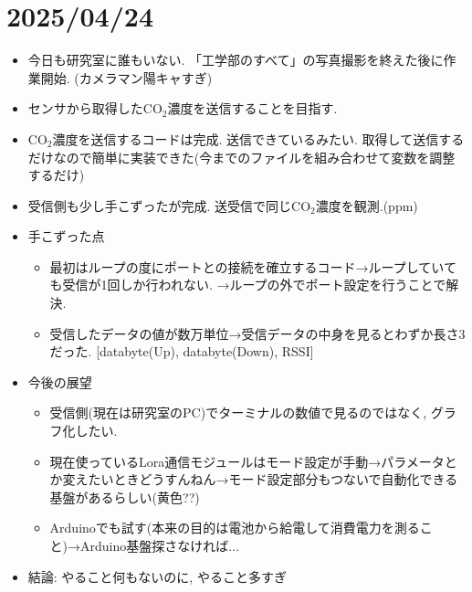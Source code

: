 \documentclass[11pt,a4paper,uplatex]{jsarticle}
\begin{document}
\section{2025/04/24}
\begin{itemize}
    \item 今日も研究室に誰もいない. 「工学部のすべて」の写真撮影を終えた後に作業開始. (カメラマン陽キャすぎ)
    \item センサから取得したCO$_2$濃度を送信することを目指す.
    \item CO$_2$濃度を送信するコードは完成. 送信できているみたい. 取得して送信するだけなので簡単に実装できた(今までのファイルを組み合わせて変数を調整するだけ)
    \item 受信側も少し手こずったが完成. 送受信で同じCO$_2$濃度を観測.(ppm)
    \item 手こずった点
    \begin{itemize}
        \item 最初はループの度にポートとの接続を確立するコード→ループしていても受信が1回しか行われない. →ループの外でポート設定を行うことで解決.
        \item 受信したデータの値が数万単位→受信データの中身を見るとわずか長さ3だった. [databyte(Up), databyte(Down), RSSI]
    \end{itemize}
    \item 今後の展望
    \begin{itemize}
        \item 受信側(現在は研究室のPC)でターミナルの数値で見るのではなく, グラフ化したい.
        \item 現在使っているLora通信モジュールはモード設定が手動→パラメータとか変えたいときどうすんねん→モード設定部分もつないで自動化できる基盤があるらしい(黄色??)
        \item Arduinoでも試す(本来の目的は電池から給電して消費電力を測ること)→Arduino基盤探さなければ$\dots$
    \end{itemize}
    \item 結論: やること何もないのに, やること多すぎ
\end{itemize}
\end{document}
